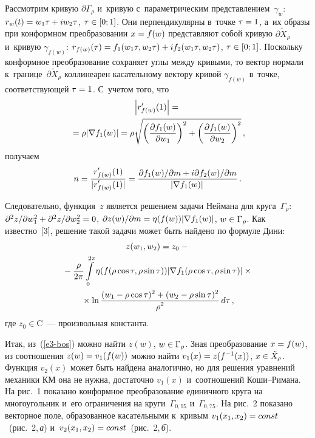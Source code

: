 \begin{multicols}{2}
  Рассмотрим кривую $\partial \Gamma_\rho$  и~кривую с~параметрическим 
представлением~$\gamma_w$: $r_w(t)\hm= w_1\tau\hm+ iw_2\tau$, $\tau\hm\in 
[0;1]$. Они перпендикулярны в~точке $\tau\hm=1$, а~их образы при конформном 
преобразовании $x\hm= f(w)$ пред\-став\-ля\-ют собой кривую 
$\partial \tilde{X}_\rho$ и~кривую $\gamma_{f(w)}$: $r_{f(w)}(\tau)\hm= f_1(w_1\tau, w_2\tau)\hm+ 
if_2(w_1\tau, w_2\tau)$, $\tau\hm\in [0;1]$. Поскольку конформное преобразование 
сохраняет углы между кривыми, то вектор нормали к~границе~$\partial 
\tilde{X}_\rho$ коллинеарен касательному век\-то\-ру кривой $\gamma_{f(w)}$ 
в~точке, со\-от\-вет\-ст\-ву\-ющей $\tau\hm=1$. С~учетом того, что
 \begin{multline*}
 \left\vert r^\prime_{f(w)}(1)\right\vert ={}\\
  {}=\rho \vert \nabla f_1(w)\vert =\rho \sqrt{\left( 
\displaystyle\frac{\displaystyle \partial f_1(w)\mathstrut}{\displaystyle \partial w_1\mathstrut}\right)^2 +\left( \displaystyle\frac{\displaystyle \partial f_1(w)\mathstrut}{\displaystyle \partial 
w_2\mathstrut}\right)^2}\,,
\end{multline*}
получаем
$$
n=\displaystyle\frac{\displaystyle r^\prime_{f(w)} (1)\mathstrut}{\displaystyle \vert r^\prime_{f(w)} (1)\vert \mathstrut}=\displaystyle\frac{\displaystyle \partial f_1(w)/\partial 
m+ i \partial f_2(w)/\partial m\mathstrut}{\displaystyle \left\vert \nabla f_1(w)\right\vert\mathstrut}\,.
$$
  
  Следовательно, функция~$z$ является решением задачи Неймана для 
круга~$\Gamma_\rho$: $\partial^2 z/ \partial w_1^2 \hm+ \partial^2 z/ \partial 
w_2^2\hm=0$, $\partial z(w)/\partial m \hm= \eta(f(w))\vert \nabla f_1(w)\vert$, 
$w\hm\in \Gamma_\rho$. Как известно~[3], решение такой задачи может быть 
найдено по формуле Дини:
  \begin{multline}
  z(w_1,w_2)=z_0-{}\\
  {}-\displaystyle\frac{\displaystyle \rho\mathstrut}{\displaystyle 2\pi\mathstrut} \int\limits_0^{2\pi} \eta (f(\rho\cos\tau, \rho\sin\tau)) \vert \nabla 
f_1(\rho\cos\tau, \rho\sin\tau)\vert \times{}\\
{}\times \ln \displaystyle\frac{\displaystyle (w_1-\rho\cos\tau)^2+(w_2-
\rho\sin\tau)^2\mathstrut}{\displaystyle \rho^2\mathstrut}\,d\tau\,,
  \label{e3-bos}
  \end{multline}
где $z_0\in \mathrm{C}$~--- произвольная константа.
  
  Итак, из~(\ref{e3-bos}) можно найти $z(w)$, $w\hm\in \Gamma_\rho$. Зная 
преобразование $x\hm= f(w)$, из соотношения $z(w)\hm= v_1(f(w))$ можно найти 
$v_1(x)\hm= z(f^{-1}(x))$, $x\hm\in \tilde{X}_\rho$. Функция $v_2(x)$ может быть 
найдена аналогично, но для решения уравнений механики КМ она не нужна, 
достаточно $v_1(x)$ и~соотношений Ко\-ши--Ри\-ма\-на. На рис.~1 показано 
конформное преобразование единичного круга на многоугольник и~его 
ограничения на круги~$\Gamma_{0{,}95}$ и~$\Gamma_{0{,}75}$. На рис.~2 
показано векторное поле, образованное касательными к~кривым $v_1(x_1, 
x_2)\hm=const$~(рис.~2,\,\textit{а}) и~$v_2(x_1,x_2)\hm= const$~(рис.~2,\,\textit{б}). 


\end{multicols}
